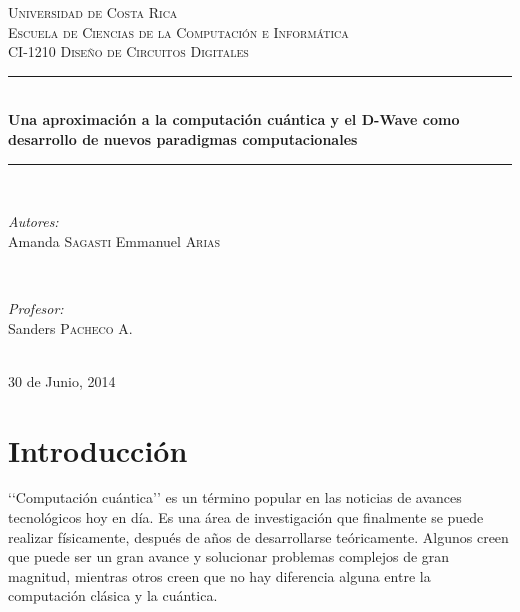 \documentclass[11pt,a4paper]{article}
\begin{document}
\begin{titlepage}

\newcommand{\HRule}{\rule{\linewidth}{0.5mm}} 

\center

\textsc{\LARGE Universidad de Costa Rica}\\[1.5cm]
\textsc{\Large Escuela de Ciencias de la Computación e Informática}\\[0.5cm] 
\textsc{\large CI-1210 Diseño de Circuitos Digitales}\\[0.5cm] 

\HRule \\[0.4cm]
{ \huge \bfseries Una aproximación a la computación cuántica y el D-Wave como desarrollo de nuevos paradigmas computacionales}\\[0.4cm] %
\HRule \\[1.5cm]

\begin{minipage}{0.4\textwidth}
\begin{flushleft} \large
\emph{Autores:}\\
Amanda \textsc{Sagasti}
Emmanuel \textsc{Arias} 
\end{flushleft}
\end{minipage}
~
\begin{minipage}{0.4\textwidth}
\begin{flushright} \large
\emph{Profesor:} \\
Sanders \textsc{Pacheco A.} %
\end{flushright}
\end{minipage}\\[4cm]

{\large 30 de Junio, 2014}\\[3cm] 

\vfill 

\end{titlepage}

\tableofcontents 

\clearpage
\part*{Introducción}

‘‘Computación cuántica’’ es un término popular en las noticias de avances tecnológicos hoy en día. Es una área de investigación que finalmente se puede realizar físicamente, después de años de desarrollarse teóricamente. Algunos creen que puede ser un gran avance y solucionar problemas complejos de gran magnitud, mientras otros creen que no hay diferencia alguna entre la computación clásica y la cuántica. 
\end{document}

